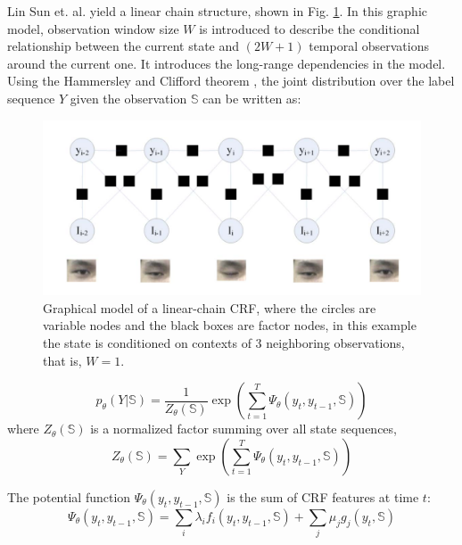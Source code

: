 \documentclass[journal]{IEEEtran}
\begin{document}
Lin Sun et. al. \cite{pan2007eyeblink} yield a linear chain structure, shown in Fig. \ref{fig_D_2}. In this graphic model, observation window size $W$ is introduced to describe the conditional relationship between the current state and $(2W+1)$ temporal observations around the current one. It introduces the long-range dependencies in the model. Using the Hammersley and Clifford theorem \cite{li2009markov}, the joint distribution over the label sequence $Y$ given the observation $\mathbb{S}$ can be written as:

\begin{figure}[!t]
\centering
\includegraphics[width=0.95\linewidth]{img/D_2}
\caption{Graphical model of a linear-chain CRF, where the circles are variable nodes and the black boxes are factor nodes, in this example the state is conditioned on contexts of 3 neighboring observations, that is, $W=1$.}
\label{fig_D_2}
\end{figure}

\begin{equation}
\label{eq_D_1}
p_\theta(Y|\mathbb{S}) = \frac{1}{Z_\theta(\mathbb{S})} \exp (\sum_{t=1}^T \Psi_\theta(y_t,y_{t-1},\mathbb{S}))
\end{equation}
where $Z_\theta(\mathbb{S})$ is a normalized factor summing over all state sequences,
\begin{equation}
\label{eq_D_2}
Z_\theta(\mathbb{S}) = \sum_Y \exp (\sum_{t=1}^T \Psi_\theta(y_t,y_{t-1},\mathbb{S}))
\end{equation}

The potential function $\Psi_\theta(y_t,y_{t-1},\mathbb{S})$ is the sum of CRF features at time $t$:
\begin{equation}
\label{eq_D_3}
\Psi_\theta(y_t,y_{t-1},\mathbb{S}) = \sum_i \lambda_i f_i(y_t,y_{t-1},\mathbb{S}) + \sum_j \mu_j g_j(y_t,\mathbb{S})
\end{equation}
\end{document}
